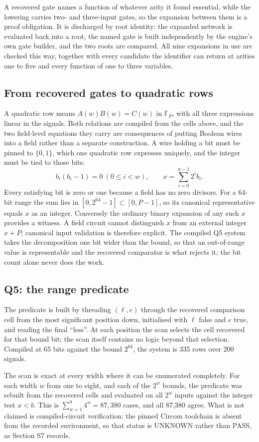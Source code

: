 \documentclass[11pt,a4paper]{article}
\newcommand{\F}{\mathbb F}
\begin{document}
A recovered gate names a function of whatever arity it found essential, while
the lowering carries two- and three-input gates, so the expansion between them
is a proof obligation. It is discharged by root identity: the expanded network
is evaluated back into a root, the named gate is built independently by the
engine's own gate builder, and the two roots are compared. All nine expansions
in use are checked this way, together with every candidate the identifier can
return at arities one to five and every function of one to three variables.

\subsection{From recovered gates to quadratic rows}
A quadratic row means $A(w)B(w)=C(w)$ in $\F_P$, with all three expressions
linear in the signals. Both relations are compiled from the cells above, and
the two field-level equations they carry are consequences of putting Boolean
wires into a field rather than a separate construction. A wire holding a bit
must be pinned to $\{0,1\}$, which one quadratic row expresses uniquely, and
the integer must be tied to those bits:
\[
 b_i(b_i-1)=0\ (0\le i<w),\qquad x=\sum_{i=0}^{w-1}2^ib_i.
\]
Every satisfying bit is zero or one because a field has no zero divisors.
For a 64-bit range the sum lies in $[0,2^{64}-1]\subset[0,P-1]$, so its
canonical representative equals $x$ as an integer. Conversely the ordinary
binary expansion of any such $x$ provides a witness. A field circuit cannot
distinguish $x$ from an external integer $x+P$; canonical input validation is
therefore explicit. The compiled Q5 system takes the decomposition one bit
wider than the bound, so that an out-of-range value is representable and the
recovered comparator is what rejects it; the bit count alone never does the
work.

\subsection{Q5: the range predicate}
The predicate is built by threading $(\ell,e)$ through the recovered comparison
cell from the most significant position down, initialised with $\ell$ false and
$e$ true, and reading the final ``less''. At each position the scan selects the
cell recovered for that bound bit; the scan itself contains no logic beyond that
selection. Compiled at 65 bits against the bound $2^{64}$, the system is 335
rows over 200 signals.

The scan is exact at every width where it can be enumerated completely. For
each width $w$ from one to eight, and each of the $2^w$ bounds, the predicate
was rebuilt from the recovered cells and evaluated on all $2^w$ inputs against
the integer test $x<b$. This is $\sum_{w=1}^{8}4^w=87{,}380$ cases, and all
87{,}380 agree. What is not claimed is compiled-circuit verification: the
pinned Circom toolchain is absent from the recorded environment, so that status
is UNKNOWN rather than PASS, as Section S7 records.
\end{document}

